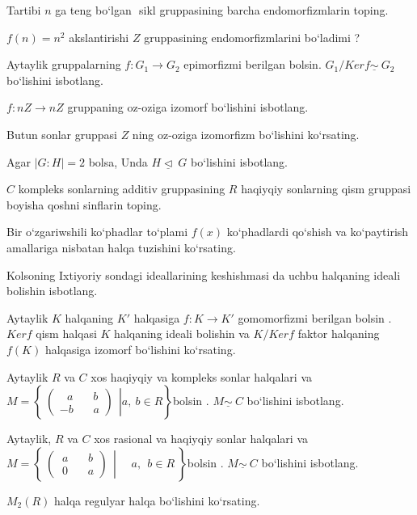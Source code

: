 Tartibi \(n\) ga teng bo`lgan \(< a >\) sikl gruppasining barcha endomorfizmlarin toping.

\(f(n) = n^{2}\) akslantirishi \(Z\) gruppasining endomorfizmlarini bo`ladimi ?

Aytaylik gruppalarning \(f:G_{1} \rightarrow G_{2}\) epimorfizmi berilgan bo\textquotesingle lsin. \(G_{1}/Kerf\underline{\sim}\ G_{2}\) bo`lishini isbotlang.

\(f:nZ \rightarrow nZ\) gruppaning o\textquotesingle z-o\textquotesingle ziga izomorf bo`lishini isbotlang.

Butun sonlar gruppasi \(Z\) ning o\textquotesingle z-o\textquotesingle ziga izomorfizm bo`lishini ko`rsating.

Agar \(|G:H| = 2\) bolsa, Unda \(H\underline{\vartriangleleft}\ G\) bo`lishini isbotlang.

\(C\) kompleks sonlarning additiv gruppasining \(R\) haqiyqiy sonlarning qism gruppasi boyisha qo\textquotesingle shni sinflarin toping.

Bir o`zgariwshili ko`phadlar to`plami \(f(x)\) ko`phadlardi qo`shish va ko`paytirish amallariga nisbatan halqa tuzishini ko`rsating.

Kolsoning Ixtiyoriy sondagi ideallarining keshishmasi da uchbu halqaning ideali bo\textquotesingle lishin isbotlang.

Aytaylik \(K\) halqaning \(K'\) halqasiga \(f:K \rightarrow K'\) gomomorfizmi berilgan bo\textquotesingle lsin . \(Kerf\) qism halqasi \(K\) halqaning ideali bo\textquotesingle lishin va \(K/Kerf\) faktor halqaning \(f(K)\) halqasiga izomorf bo`lishini ko`rsating.

Aytaylik \(R\) va \(C\) xos haqiyqiy va kompleks sonlar halqalari va\(M = \left\{ \left. \ \begin{pmatrix}
\ \ \ a\ \ \ \ \ \ \ \ b \\
 - b\ \ \ \ \ \ \ \ a
\end{pmatrix}\ \  \right|a,\ b \in R \right\}\)bo\textquotesingle lsin . \(M\underline{\sim}\ C\) bo`lishini isbotlang.

Aytaylik, \(R\) va \(C\) xos rasional va haqiyqiy sonlar halqalari va\(M = \left\{ \left. \ \begin{pmatrix}
\ a\ \ \ \ \ \ \ \ b \\
\ 0\ \ \ \ \ \ \ \ a
\end{pmatrix}\ \  \right|\ \ \ \ \ \ a,\ \ b \in R\  \right\}\)bo\textquotesingle lsin . \(M\underline{\sim}\ C\) bo`lishini isbotlang.

\(M_{2}(R)\) halqa regulyar halqa bo`lishini ko`rsating.

